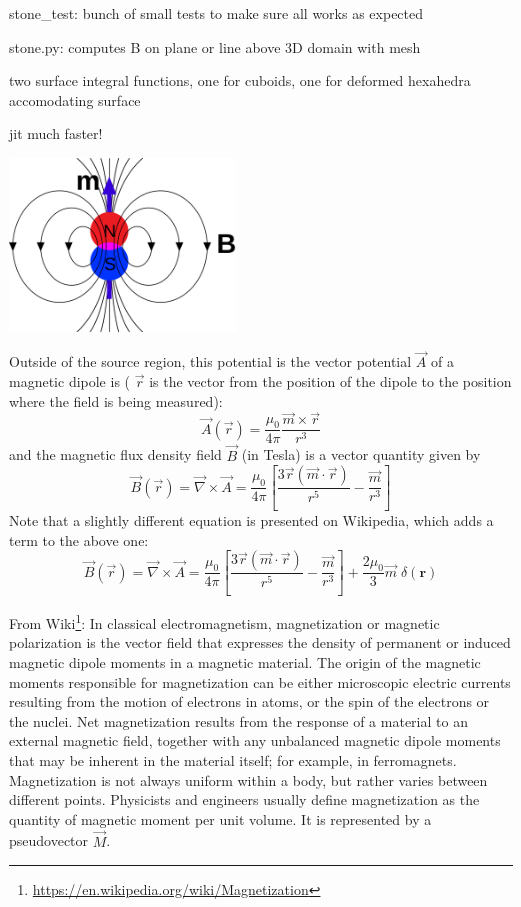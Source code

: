 





stone\_test: bunch of small tests to make sure all works as expected 

stone.py: computes B on plane or line above 3D domain with mesh

two surface integral functions, one for cuboids, one for deformed hexahedra accomodating surface

jit much faster!









\begin{center}
\includegraphics[width=6cm]{python_codes/fieldstone_138/images/Magnetic_field_due_to_dipole_moment.png}
\end{center}

Outside of the source region, this potential is the vector potential $\vec A$ of a magnetic dipole is (
$\vec r$ is the vector from the position of the dipole to the position where the field is being measured):
\[
\vec A(\vec r) = \frac{\mu_0}{4 \pi} \frac{\vec m \times \vec r}{r^3}
\]
and the magnetic flux density field $\vec B$ (in Tesla) is a vector quantity given by
\[
\vec B (\vec r) = \vec \nabla \times \vec A 
=
\frac{\mu_0}{4\pi} \left[  \frac{3 \vec r (\vec m \cdot \vec r)}{r^5} - \frac{\vec m}{r^3}  \right]
\]
Note that a slightly different equation is presented on Wikipedia, which adds a term to the above one:
\[
\vec B (\vec r) = \vec \nabla \times \vec A 
=
\frac{\mu_0}{4\pi} \left[  \frac{3 \vec r (\vec m \cdot \vec r)}{r^5} - \frac{\vec m}{r^3}  \right]
+ \frac{2\mu_0}{3} \vec m \; \delta(\bm r)
\]

From Wiki\footnote{\url{https://en.wikipedia.org/wiki/Magnetization}}: In classical electromagnetism, magnetization or magnetic polarization is the vector field that expresses the density of permanent or induced magnetic dipole moments in a magnetic material. The origin of the magnetic moments responsible for magnetization can be either microscopic electric currents resulting from the motion of electrons in atoms, or the spin of the electrons or the nuclei. Net magnetization results from the response of a material to an external magnetic field, together with any unbalanced magnetic dipole moments that may be inherent in the material itself; for example, in ferromagnets. Magnetization is not always uniform within a body, but rather varies between different points. 
Physicists and engineers usually define magnetization as the quantity of magnetic moment per unit volume. It is represented by a pseudovector $\vec M$.

